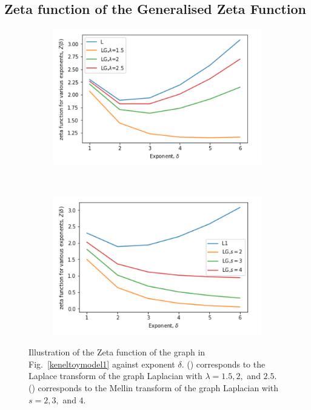 \documentclass[10pt,a4paper]{article}
\begin{document}
	  \subsection{Zeta function of the Generalised Zeta Function}
	  \begin{figure}[H]
	  	\centering
	  	\begin{subfigure}[b]{0.35\textwidth}
	  		\includegraphics[width= \textwidth]{images/zeta-laplace.png}
	  		\caption{}
	  		\label{zeta-laplace}
	  	\end{subfigure}~
	  	\begin{subfigure}[b]{0.35\textwidth}
	  		\includegraphics[width= \textwidth]{images/zeta-mellin.png}
	  		\caption{}
	  		\label{zeta-mellin}
	  	\end{subfigure} 
	  	\caption{Illustration of the Zeta function of the graph in Fig.~\ref{keneltoymodel1} against exponent $\delta$. () corresponds to the Laplace transform of the graph Laplacian with $\lambda = 1.5, 2,$ and $2.5$. () corresponds to the Mellin transform of the graph Laplacian with $s = 2, 3,$ and $4$. }
	  	\label{}
	  \end{figure}
  
\end{document}
